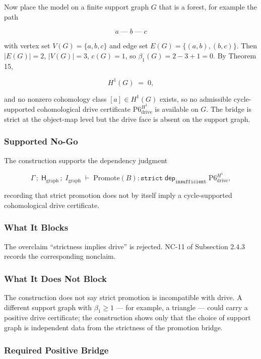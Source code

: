 \documentclass[11pt]{article}
\theoremstyle{definition}
\begin{document}
Now place the model on a finite support graph \(G\) that is a forest, for example the path

\[
a\;\text{---}\;b\;\text{---}\;c
\]

with vertex set \(V(G)=\{a,b,c\}\) and edge set \(E(G)=\{(a,b),(b,c)\}\). Then \(|E(G)|=2\), \(|V(G)|=3\), \(c(G)=1\), so \(\beta_1(G)=2-3+1=0\). By Theorem 15,

\[
H^1(G)\;=\;0,
\]

and no nonzero cohomology class \([a]\in H^1(G)\) exists, so no admissible cycle-supported cohomological drive certificate \(\mathrm{P6}_{\mathrm{drive}}^{H^1}\) is available on \(G\). The bridge is strict at the object-map level but the drive face is absent on the support graph.

\subsubsection{Supported No-Go}

The construction supports the dependency judgment

\[
\Gamma\,;\;\mathsf H_{\mathrm{graph}}\,;\;I_{\mathrm{graph}}\;\vdash\;\mathrm{Promote}(B):\texttt{strict}\;\mathrel{\mathsf{dep}_{\texttt{insufficient}}}\;\mathrm{P6}_{\mathrm{drive}}^{H^1},
\]

recording that strict promotion does not by itself imply a cycle-supported cohomological drive certificate.

\subsubsection{What It Blocks}

The overclaim ``strictness implies drive'' is rejected. NC-11 of Subsection 2.4.3 records the corresponding nonclaim.

\subsubsection{What It Does Not Block}

The construction does not say strict promotion is incompatible with drive. A different support graph with \(\beta_1\ge 1\) --- for example, a triangle --- could carry a positive drive certificate; the construction shows only that the choice of support graph is independent data from the strictness of the promotion bridge.

\subsubsection{Required Positive Bridge}
\end{document}
